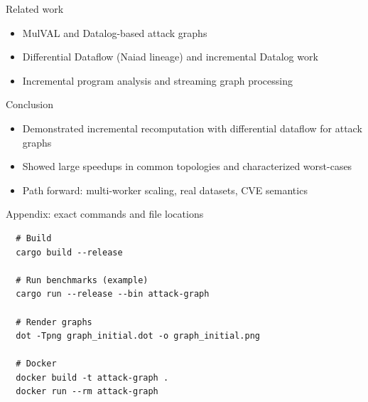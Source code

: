 \documentclass[professionalfonts]{beamer}
\begin{document}
\begin{frame}{Related work}
  \begin{itemize}
    \item MulVAL and Datalog-based attack graphs
    \item Differential Dataflow (Naiad lineage) and incremental Datalog work
    \item Incremental program analysis and streaming graph processing
  \end{itemize}
\end{frame}

\begin{frame}{Conclusion}
  \begin{itemize}
    \item Demonstrated incremental recomputation with differential dataflow for attack graphs
    \item Showed large speedups in common topologies and characterized worst-cases
    \item Path forward: multi-worker scaling, real datasets, CVE semantics
  \end{itemize}
\end{frame}

\begin{frame}{Appendix: exact commands and file locations}
  \small
  \begin{verbatim}
  # Build
  cargo build --release

  # Run benchmarks (example)
  cargo run --release --bin attack-graph

  # Render graphs
  dot -Tpng graph_initial.dot -o graph_initial.png

  # Docker
  docker build -t attack-graph .
  docker run --rm attack-graph
  \end{verbatim}
\end{frame}
\end{document}
